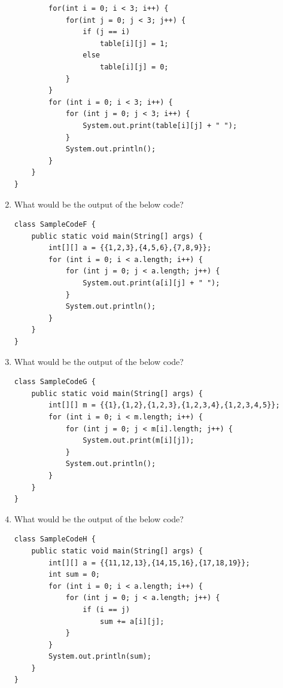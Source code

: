 \documentclass[11pt,a4paper]{article}
\def\AnswerBox{\fbox{\begin{minipage}{4in}\hfill\vspace{0.5in}  \end{minipage}}}
\begin{document}
\begin{enumerate}
\begin{lstlisting}
        for(int i = 0; i < 3; i++) {
            for(int j = 0; j < 3; j++) {
                if (j == i) 
                    table[i][j] = 1;
                else 
                    table[i][j] = 0;
            }
        }
        for (int i = 0; i < 3; i++) {
            for (int j = 0; j < 3; i++) {
                System.out.print(table[i][j] + " ");
            }
            System.out.println();
        }
    }
}
\end{lstlisting}
\AnswerBox
\item What would be the output of the below code?
\begin{lstlisting}
class SampleCodeF {
    public static void main(String[] args) {
        int[][] a = {{1,2,3},{4,5,6},{7,8,9}};
        for (int i = 0; i < a.length; i++) {
            for (int j = 0; j < a.length; j++) {
                System.out.print(a[i][j] + " ");
            }
            System.out.println();
        }
    }
}
\end{lstlisting}
\AnswerBox
\item What would be the output of the below code?
\begin{lstlisting}
class SampleCodeG {
    public static void main(String[] args) {
        int[][] m = {{1},{1,2},{1,2,3},{1,2,3,4},{1,2,3,4,5}};
        for (int i = 0; i < m.length; i++) {
            for (int j = 0; j < m[i].length; j++) {
                System.out.print(m[i][j]);
            }
            System.out.println();
        }
    }
}
\end{lstlisting}
\AnswerBox
\item What would be the output of the below code?
\begin{lstlisting}
class SampleCodeH {
    public static void main(String[] args) {
        int[][] a = {{11,12,13},{14,15,16},{17,18,19}};
        int sum = 0;
        for (int i = 0; i < a.length; i++) {
            for (int j = 0; j < a.length; j++) {
                if (i == j)
                    sum += a[i][j];
            }
        }
        System.out.println(sum);
    }
}
\end{lstlisting}
\AnswerBox
\end{enumerate}
\end{document}
